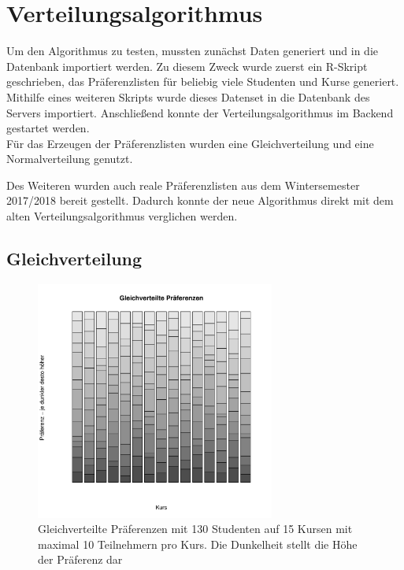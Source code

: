 	\section{Verteilungsalgorithmus}
		Um den Algorithmus zu testen, mussten zunächst Daten generiert und in die Datenbank importiert werden.
		Zu diesem Zweck wurde zuerst ein R-Skript geschrieben, das Präferenzlisten für beliebig viele Studenten und Kurse generiert.
		Mithilfe eines weiteren Skripts wurde dieses Datenset in die Datenbank des Servers importiert.
		Anschließend konnte der Verteilungsalgorithmus im Backend gestartet werden.\\
		
		Für das Erzeugen der Präferenzlisten wurden eine Gleichverteilung und eine Normalverteilung genutzt.
    	
        Des Weiteren wurden auch reale Präferenzlisten aus dem Wintersemester 2017/2018 bereit gestellt.
		Dadurch konnte der neue Algorithmus direkt mit dem alten Verteilungsalgorithmus verglichen werden.
		
		\subsection{Gleichverteilung}
	
			\begin{figure}
				\centering
				\includegraphics[width=0.7\textwidth]{./testing/images/EqualDistPreferencesDist.jpg}
				\caption{Gleichverteilte Präferenzen mit 130 Studenten auf 15 Kursen mit maximal 10 Teilnehmern pro Kurs. Die Dunkelheit stellt die Höhe der Präferenz dar}
				\label{fig:test_equal_distribution}
			\end{figure}
        
